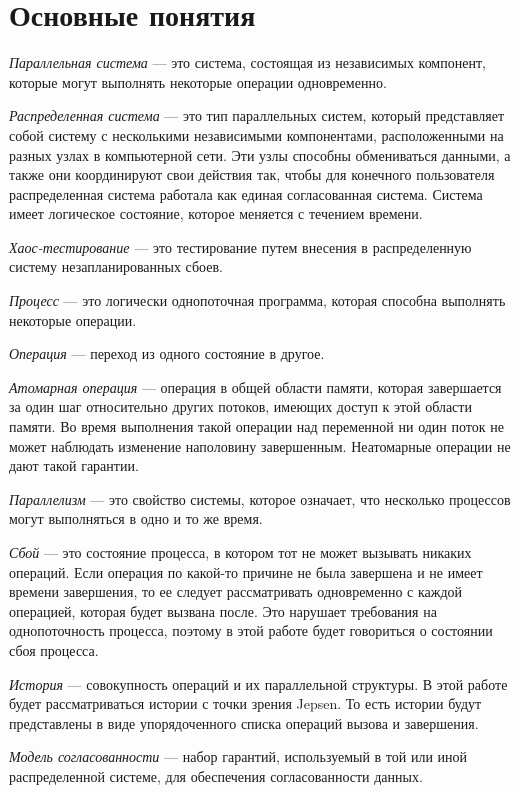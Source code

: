 \documentclass[12pt,  openany]{book}
\begin{document}
\section{Основные понятия}

\emph{Параллельная система} --- это система, состоящая из независимых компонент, которые могут выполнять некоторые операции одновременно.

\emph{Распределенная система} --- это тип параллельных систем, который представляет собой систему с несколькими независимыми компонентами, расположенными на разных узлах в компьютерной сети. Эти узлы способны обмениваться данными, а также они координируют свои действия так, чтобы для конечного пользователя распределенная система работала как единая согласованная система. Система имеет логическое состояние, которое меняется с течением времени.

\emph{Хаос-тестирование \cite{chaosTesting}} --- это тестирование путем внесения в распределенную систему незапланированных сбоев.

\emph{Процесс} --- это логически однопоточная программа, которая способна выполнять некоторые операции.

\emph{Операция} --- переход из одного состояние в другое.

\emph{Атомарная операция} --- операция в общей области памяти, которая завершается за один шаг относительно других потоков, имеющих доступ к этой области памяти. Во время выполнения такой операции над переменной ни один поток не может наблюдать изменение наполовину завершенным. Неатомарные операции не дают такой гарантии. \cite{habrAtomicOperation}

\emph{Параллелизм} --- это свойство системы, которое означает, что несколько процессов могут выполняться в одно и то же время.

\emph{Сбой} --- это состояние процесса, в котором тот не может вызывать никаких операций. Если операция по какой-то причине не была завершена и не имеет времени завершения, то ее следует рассматривать одновременно с каждой операцией, которая будет вызвана после. Это нарушает требования на однопоточность процесса, поэтому в этой работе будет говориться о состоянии сбоя процесса.

\emph{История} --- совокупность операций и их параллельной структуры. В этой работе будет рассматриваться истории с точки зрения Jepsen. То есть истории будут представлены в виде упорядоченного списка операций вызова и завершения.

\emph{Модель согласованности} --- набор гарантий, используемый в той или иной распределенной системе, для обеспечения согласованности данных.
\end{document}
